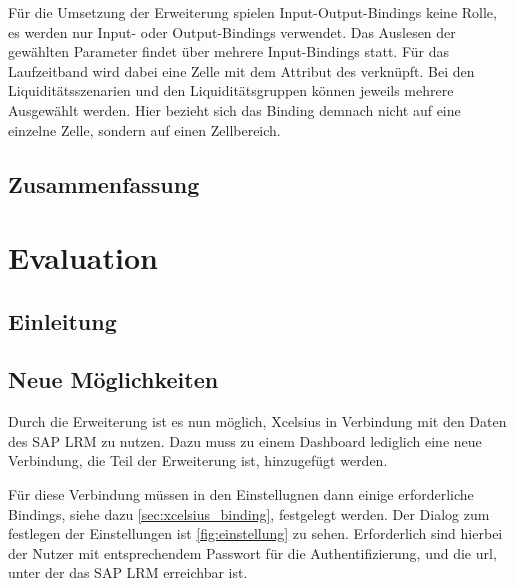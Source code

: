 \begin{onehalfspacing}
Für die Umsetzung der Erweiterung spielen Input-Output-Bindings keine Rolle, es werden nur Input- oder Output-Bindings verwendet. Das Auslesen der gewählten Parameter findet über mehrere Input-Bindings statt. Für das Laufzeitband wird dabei eine Zelle mit dem Attribut  des  verknüpft. Bei den Liquiditätsszenarien und den Liquiditätsgruppen können jeweils mehrere Ausgewählt werden. Hier bezieht sich das Binding demnach nicht auf eine einzelne Zelle, sondern auf einen Zellbereich.


\section{Zusammenfassung}
\loreIpsum

\chapter{Evaluation} 



\section{Einleitung}
\loreIpsum

\section{Neue Möglichkeiten}
Durch die Erweiterung ist es nun möglich, \gls{Xcelsius} in Verbindung mit den Daten des SAP LRM zu nutzen. Dazu muss zu einem Dashboard lediglich eine neue Verbindung, die Teil der Erweiterung ist, hinzugefügt werden.

Für diese Verbindung müssen in den Einstellugnen dann einige erforderliche Bindings, siehe dazu \vref{sec:xcelsius_binding}, festgelegt werden. Der Dialog zum festlegen der Einstellungen ist  \vref{fig:einstellung} zu sehen. Erforderlich sind hierbei der Nutzer mit entsprechendem Passwort für die Authentifizierung, und die \gls{url}, unter der das SAP LRM erreichbar ist.


\end{onehalfspacing}
